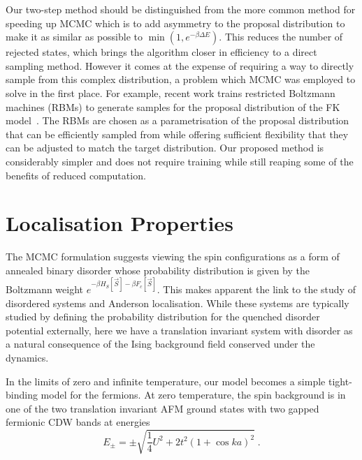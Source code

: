 Our two-step method should be distinguished from the more common method for speeding up {MCMC} which is to add asymmetry to the proposal distribution to make it as similar as possible to \(\min\left(1, e^{-\beta \Delta E}\right)\). This reduces the number of rejected states, which brings the algorithm closer in efficiency to a direct sampling method. However it comes at the expense of requiring a way to directly sample from this complex distribution, a problem which {MCMC} was employed to solve in the first place. For example, recent work trains restricted Boltzmann machines (RBMs) to generate samples for the proposal distribution of the {FK} model~\autocite{huangAcceleratedMonteCarlo2017}. The RBMs are chosen as a parametrisation of the proposal distribution that can be efficiently sampled from while offering sufficient flexibility that they can be adjusted to match the target distribution. Our proposed method is considerably simpler and does not require training while still reaping some of the benefits of reduced computation.

\hypertarget{localisation-properties}{%
\section{Localisation Properties}\label{localisation-properties}}

The {MCMC} formulation suggests viewing the spin configurations as a form of annealed binary disorder whose probability distribution is given by the Boltzmann weight \(e^{-\beta H_S[\vec{S}] - \beta F_c[\vec{S}]}\). This makes apparent the link to the study of disordered systems and Anderson localisation. While these systems are typically studied by defining the probability distribution for the quenched disorder potential externally, here we have a translation invariant system with disorder as a natural consequence of the Ising background field conserved under the dynamics.

In the limits of zero and infinite temperature, our model becomes a simple tight-binding model for the fermions. At zero temperature, the spin background is in one of the two translation invariant AFM ground states with two gapped fermionic CDW bands at energies \[E_{\pm} = \pm\sqrt{\frac{1}{4}U^2 + 2t^2(1 + \cos ka)^2}\;.\]

